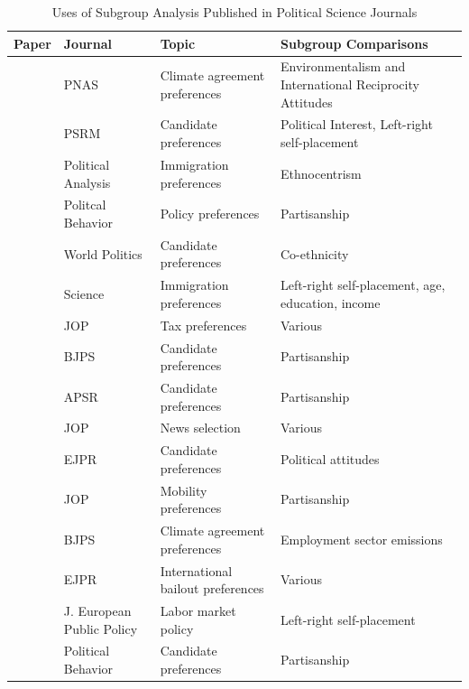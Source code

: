 \documentclass[a4paper,12pt]{article}\usepackage[]{graphicx}\usepackage[]{color}
\begin{document}
\begin{table}
\caption{Uses of Subgroup Analysis Published in Political Science Journals}\label{tab:papers}
\begin{center}
\scriptsize
\begin{tabular}{p{1.5in} p{1.5in} p{1.5in} p{1.5in}}\toprule
\textbf{Paper} & \textbf{Journal} & \textbf{Topic} & \textbf{Subgroup Comparisons} \\ \midrule
\citet{BechtelScheve2013} & PNAS & Climate agreement preferences & Environmentalism and International Reciprocity Attitudes \\ \midrule
\citet{FranchinoZucchini2014} & PSRM & Candidate preferences & Political Interest, Left-right self-placement\\ \midrule
\citet{HainmuellerHopkinsYamamoto2014} & Political Analysis & Immigration preferences & Ethnocentrism \\ \midrule
\citet{HansenOlsenBech2014} & Politcal Behavior & Policy preferences & Partisanship \\ \midrule
\citet{Carlson2015} & World Politics & Candidate preferences & Co-ethnicity \\ \midrule
\citet{BansakHainmuellerHangartner2016} & Science & Immigration preferences & Left-right self-placement, age, education, income\\ \midrule
\citet{BallardRosaMartinScheve2016} & JOP & Tax preferences & Various\\ \midrule
\citet{Campbelletal2016} & BJPS & Candidate preferences & Partisanship \\ \midrule
\citet{CarnesLupu2016} & APSR & Candidate preferences & Partisanship \\ \midrule
\citet{Mummolo2016} & JOP & News selection & Various\\ \midrule
\citet{VivyanWagner2016} & EJPR & Candidate preferences & Political attitudes \\ \midrule
\citet{MummoloNall2017} & JOP & Mobility preferences & Partisanship \\ \midrule
\citet{BechtelGenoveseScheve2017} & BJPS & Climate agreement preferences & Employment sector emissions \\ \midrule
\citet{BechtelHainmuellerMargalit2017} & EJPR & International bailout preferences & Various\\ \midrule
\citet{GallegoMarx2017} & J. European Public Policy & Labor market policy & Left-right self-placement \\ \midrule
\citet{KirklandCoppock2017} & Political Behavior & Candidate preferences & Partisanship \\ \midrule

\end{tabular}
\end{center}
\end{table}
\end{document}
